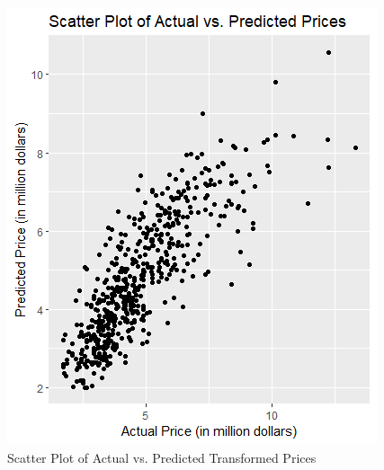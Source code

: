 \documentclass[10pt]{article}
\begin{document}
\begin{figure}[H]
  \centering
  \includegraphics[width=0.6\linewidth]{Final project/Visualizations/Scatterplot_2.png}
  \caption{Scatter Plot of Actual vs. Predicted Transformed Prices}
   \label{fig:3}
\end{figure}
\end{document}
